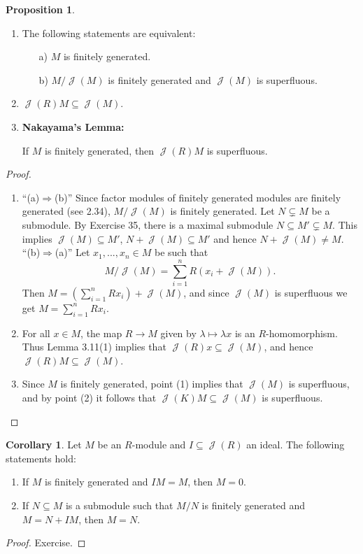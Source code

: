 \documentclass[12pt,a4paper]{report}
\theoremstyle{definition}
\newtheorem{corollary}[theorem]{Corollary} %
\newtheorem{proposition}[theorem]{Proposition}
\theoremstyle{num.custom-title}
\DeclareMathOperator{\J}{\mathcal{J}}
\DeclareMathOperator{\imp}{\Rightarrow}
\DeclareMathOperator{\sse}{\subseteq}
\begin{document}
\begin{proposition}\ 
\begin{enumerate} 
\item The following statements are equivalent:
\begin{itemize}
\item[a)] $M$ is finitely generated.
\item[b)] $M/\J(M)$ is finitely generated and $\J(M)$ is superfluous.
\end{itemize}
\item $\J(R)M \sse \J(M)$.
\item \textbf{Nakayama's Lemma:}
\begin{center}
If $M$ is finitely generated, then $\J(R)M$ is superfluous.
\end{center}
\end{enumerate}
\begin{proof}\ 
\begin{enumerate}
\item ``(a)$\imp$(b)'' Since factor modules of finitely generated modules are finitely generated (see 2.34), $M/\J(M)$ is finitely generated. Let $N \subsetneq M$ be a submodule. By Exercise 35, there is a maximal submodule $N \sse M' \subsetneq M$. This implies $\J(M) \sse M'$, $N + \J(M) \sse M'$ and hence $N + \J(M) \neq M$.
\\[6pt]
``(b)$\imp$(a)'' Let $x_1,...,x_n \in M$ be such that
\[
M/\J(M) = \sum_{i=1}^n R(x_i + \J(M)).
\]
Then $M = (\sum_{i=1}^n R x_i) + \J(M)$, and since $\J(M)$ is superfluous we get $M = \sum_{i=1}^n R x_i$.
\item For all $x \in M$, the map $R \to M$ given by $\lambda \mapsto \lambda x$ is an $R$-homomorphism. Thus Lemma 3.11(1) implies that $\J(R) x \sse \J(M)$, and hence $\J(R)M \sse \J(M)$.
\item Since $M$ is finitely generated, point (1) implies that $\J(M)$ is superfluous, and by point (2) it follows that $\J(K)M \sse \J(M)$ is superfluous.
\end{enumerate}
\end{proof}
\end{proposition}

\begin{corollary}
Let $M$ be an $R$-module and $I \sse \J(R)$ an ideal. The following statements hold:
\begin{enumerate}
\item If $M$ is finitely generated and $IM=M$, then $M=0$.
\item If $N \sse M$ is a submodule such that $M/N$ is finitely generated and $M=N+IM$, then $M=N$.
\end{enumerate}
\begin{proof}
Exercise.
\end{proof}
\end{corollary}
\end{document}
